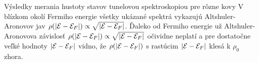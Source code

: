 \documentclass[
	11pt, %
]{beamer}
\begin{document}
\begin{frame}
\vspace{-10mm}
\begin{figure}%
    \centering
    \label{fig:example}%
\end{figure}
\small
Výsledky merania hustoty stavov tunelovou spektroskopiou pre rôzne kovy
V blízkom okolí Fermiho energie všetky ukázané spektrá vykazujú Altshuler-Aronovov jav $\rho(|\mathcal{E}- \mathcal{E}_F|) \propto \sqrt{|\mathcal{E}- \mathcal{E}_F|}$. Ďaleko od Fermiho energie už Altshuler-Aronovova závislosť
$\rho(|\mathcal{E}- \mathcal{E}_F|) \propto \sqrt{|\mathcal{E}- \mathcal{E}_F|}$ očividne neplatí a pre dostatočne veľké hodnoty $|\mathcal{E} - \mathcal{E}_F|$ vidno, že $\rho(|\mathcal{E}- \mathcal{E}_F|)$ s rastúcim $|\mathcal{E} - \mathcal{E}_F|$ klesá k $\rho_0$ zhora.
\normalsize
\end{frame}
\end{document}
